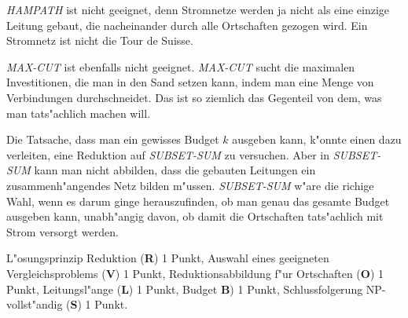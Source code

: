 \begin{diskussion}
\textsl{HAMPATH} ist nicht geeignet, denn Stromnetze werden ja nicht als eine einzige
Leitung gebaut, die nacheinander durch alle Ortschaften gezogen wird. Ein Stromnetz
ist nicht die Tour de Suisse.

\textsl{MAX-CUT} ist ebenfalls nicht geeignet. \textsl{MAX-CUT} sucht die maximalen
Investitionen, die man in den Sand setzen kann, indem man eine Menge von Verbindungen
durchschneidet. Das ist so ziemlich das Gegenteil von dem, was man tats"achlich machen
will.

Die Tatsache, dass man ein gewisses Budget $k$ ausgeben kann, k"onnte einen dazu
verleiten, eine Reduktion auf \textsl{SUBSET-SUM} zu versuchen. Aber in
\textsl{SUBSET-SUM} kann man nicht abbilden, dass die gebauten Leitungen ein
zusammenh"angendes Netz bilden m"ussen. \textsl{SUBSET-SUM} w"are die richige
Wahl, wenn es darum ginge herauszufinden, ob man genau das gesamte Budget ausgeben
kann, unabh"angig davon, ob damit die Ortschaften tats"achlich mit Strom versorgt
werden.
\end{diskussion}

\begin{bewertung}
L"osungsprinzip Reduktion ({\bf R}) 1 Punkt,
Auswahl eines geeigneten Vergleichsproblems ({\bf V}) 1 Punkt,
Reduktionsabbildung f"ur Ortschaften ({\bf O}) 1 Punkt,
Leitungsl"ange ({\bf L}) 1 Punkt,
Budget {\bf B}) 1 Punkt,
Schlussfolgerung NP-vollst"andig ({\bf S}) 1 Punkt.
\end{bewertung}

